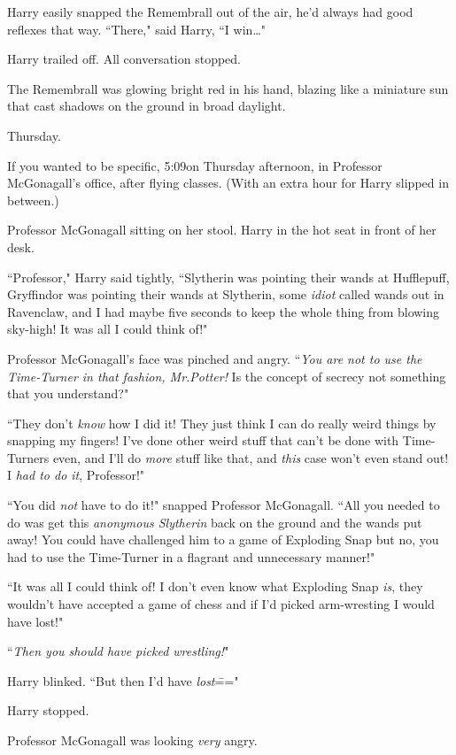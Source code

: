 Harry easily snapped the Remembrall out of the air, he'd always had good reflexes that way. ``There," said Harry, ``I win{\ldots}"

Harry trailed off. All conversation stopped.

The Remembrall was glowing bright red in his hand, blazing like a miniature sun that cast shadows on the ground in broad daylight.

\later

Thursday.

If you wanted to be specific, 5:09\pm on Thursday afternoon, in Professor McGonagall's office, after flying classes. (With an extra hour for Harry slipped in between.)

Professor McGonagall sitting on her stool. Harry in the hot seat in front of her desk.

``Professor," Harry said tightly, ``Slytherin was pointing their wands at Hufflepuff, Gryffindor was pointing their wands at Slytherin, some \emph{idiot} called wands out in Ravenclaw, and I had maybe five seconds to keep the whole thing from blowing sky-high! It was all I could think of!"

Professor McGonagall's face was pinched and angry. ``\emph{You are not to use the Time-Turner in that fashion, Mr.\?Potter!} Is the concept of secrecy not something that you understand?"

``They don't \emph{know} how I did it! They just think I can do really weird things by snapping my fingers! I've done other weird stuff that can't be done with Time-Turners even, and I'll do \emph{more} stuff like that, and \emph{this} case won't even stand out! I \emph{had to do it}, Professor!"

``You did \emph{not} have to do it!" snapped Professor McGonagall. ``All you needed to do was get this \emph{anonymous Slytherin} back on the ground and the wands put away! You could have challenged him to a game of Exploding Snap but no, you had to use the Time-Turner in a flagrant and unnecessary manner!"

``It was all I could think of! I don't even know what Exploding Snap \emph{is}, they wouldn't have accepted a game of chess and if I'd picked arm-wresting I would have lost!"

``\emph{Then you should have picked wrestling!}"

Harry blinked. ``But then I'd have \emph{lost}\==="

Harry stopped.

Professor McGonagall was looking \emph{very} angry.

